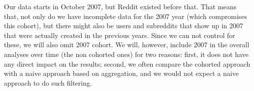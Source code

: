 Our data starts in October 2007, but Reddit existed before that. That means that, not only do we have incomplete data for the 2007 year (which compromises this cohort), but there might also be users and subreddits that show up in 2007 that were actually created in the previous years. Since we can not control for these, we will also omit 2007 cohort. We will, however, include 2007 in the overall analyses over time (the non cohorted ones) for two reasons: first, it does not have any direct impact on the results; second, we often compare the cohorted approach with a naive approach based on aggregation, and we would not expect a naive approach to do such filtering. 
